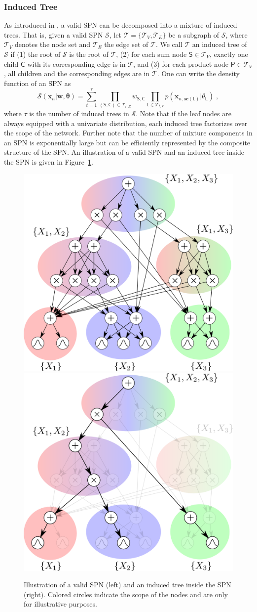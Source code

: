 \documentclass[10pt,letterpaper]{article}
\newcommand{\SPT}{\mathcal{T}}
\newcommand{\SPN}{\mathcal{S}}
\newcommand{\x}{\mathbf{x}}
\newcommand{\xn}{\mathbf{x}_{n}}
\newcommand{\ProductNode}{\mathsf{P}}
\newcommand{\SumNode}{\mathsf{S}}
\newcommand{\Leaf}{\mathsf{L}}
\newcommand{\Child}{\mathsf{C}}
\newcommand{\scope}{\ensuremath{\mathbf{sc}}} %
\newcommand{\w}{w}
\theoremstyle{mystyle}
\begin{document}
\subsubsection{Induced Tree}
As introduced in \cite{Zhao2016}, a valid SPN can be decomposed into a mixture of induced trees.
That is, given a valid SPN $\SPN$, let $\SPT = \{ \SPT_V, \SPT_E \}$ be a subgraph of $\SPN$, where $\SPT_V$ denotes the node set and $\SPT_E$ the edge set of $\SPT$. 
We call $\SPT$ an induced tree of $\SPN$ if (1) the root of $\SPN$ is the root of $\SPT$, (2) for each sum node $\SumNode \in \SPT_V$, exactly one child $\Child$ with its corresponding edge is in $\SPT$, and (3) for each product node $\ProductNode \in \SPT_V$, all children and the corresponding edges are in $\SPT$.
One can write the density function of an SPN as
\begin{equation} \label{eq:InducedTree}
  \SPN(\xn | \bm w, \bm \theta) = \sum_{t=1}^{\tau} \prod_{(\SumNode,\Child) \in \SPT_{t,E}} \w_{\SumNode,\Child} \prod_{\Leaf \in \SPT_{t,V}} p(\x_{n,\scope(\Leaf)}| \theta_{\Leaf}) \; ,
\end{equation}
where $\tau$ is the number of induced trees in $\SPN$.
Note that if the leaf nodes are always equipped with a univariate distribution, each induced tree factorizes over the scope of the network.
Further note that the number of mixture components in an SPN is exponentially large but can be efficiently represented by the composite structure of the SPN.
An illustration of a valid SPN and an induced tree inside the SPN is given in Figure~\ref{fig:inducedTree}.
\begin{figure}%
    \centering
    \includegraphics[width=0.4\linewidth]{spn}%
    \hfill
    \includegraphics[width=0.4\linewidth]{inducedTree}
    \caption{Illustration of a valid SPN (left) and an induced tree inside the SPN (right). Colored circles indicate the scope of the nodes and are only for illustrative purposes.}%
    \label{fig:inducedTree}%
\end{figure}
\end{document}
